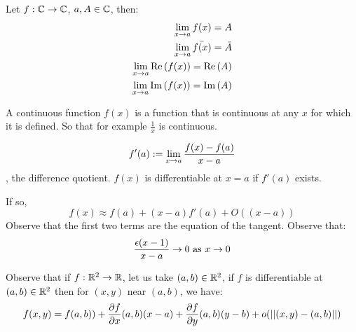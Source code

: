\begin{prop}
	Let $ f : \mathbb{C} \rightarrow \mathbb{C} $, $ a, A  \in \mathbb{C}$, then:
	\begin{align*}
	\lim_{ x \rightarrow a} f(x) = A \\
	\lim\limits_{x \rightarrow a}  \bar{f(x)} = \bar{A} \\
	\lim\limits_{x \rightarrow a} \mathrm{Re} \left( f(x) \right)  = \mathrm{Re} \left( A \right) \\
	\lim\limits_{x \rightarrow a} \mathrm{Im} \left( f(x) \right) = \mathrm{Im} \left( A \right) 
	\end{align*}
\end{prop}
A continuous function $f(x) $ is a function that is continuous at any $x$ for which it is defined.
So that for example $ \frac{1}{x} $ is continuous.
\begin{define}
	\[ f'(a)  := \lim\limits_{x \rightarrow a} \frac{f(x) - f(a)}{x-a} \], the difference quotient.
	$f(x) $ is differentiable at $ x =a $ if $ f'(a) $ exists. 
	
	If so,
	\[ f(x) \approx f(a) + (x-a)f'(a) + O((x-a)) \]
	Observe that the first two terms are the equation of the tangent.
	Observe that:
	\[ \frac{\epsilon(x-1)}{x-a} \rightarrow 0 \textrm{ as } x \rightarrow 0\]
\end{define}
Observe that if $f : \mathbb{R}^2 \rightarrow \mathbb{R} $, let us take $ (a,b) \in \mathbb{R}^2 $, if $f$ is differentiable at $ (a,b) \in\mathbb{R}^2$ then for $(x,y)$ near $(a,b) $, we have:
\[ f(x,y) = f(a,b)) + \frac{\partial f}{\partial x}(a,b) (x-a) + \frac{ \partial f}{\partial y}(a,b) (y-b) + o(\left| \left| (x,y) - (a,b) \right| \right|)\]

